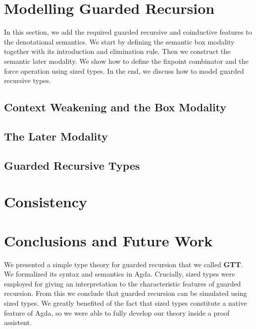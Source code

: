 \documentclass[a4paper,UKenglish,cleveref, autoref,numberwithinsect]{lipics-v2019}
\newcommand{\GTT}{\textbf{GTT}}
\begin{document}
\section{Modelling Guarded Recursion}
\label{sec:guarded}
In this section, we add the required guarded
recursive and coinductive features to the denotational semantics.
We start by defining the semantic box modality together with its
introduction and elimination rule. Then we construct the semantic
later modality. We show how to define the fixpoint combinator and the
force operation using sized types. In the end, we discuss how to model
guarded recursive types.

\subsection{Context Weakening and the Box Modality}



\subsection{The Later Modality}
\label{sec:later}




\subsection
{Guarded Recursive Types}
\label{sec:grt}


\section{Consistency}
\label{sec:consistent}


\section{Conclusions and Future Work}
\label{sec:concl}
We presented a simple type theory for guarded recursion that we called \GTT. We
formalized its syntax and semantics in Agda. Crucially, sized types
were employed for giving an interpretation to the characteristic
features of guarded recursion. From this we conclude that guarded
recursion can be simulated using sized types. We greatly benefited
of the fact that sized types constitute a native feature of Agda, so
we were able to fully develop our theory inside a proof assistent. 
\end{document}
